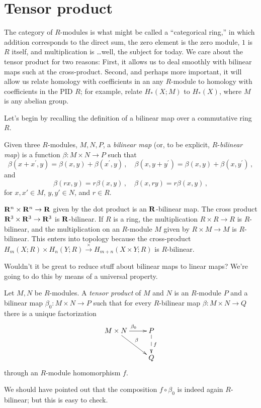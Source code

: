 \section{Tensor product}

The category of $R$-modules is what might be called a ``categorical ring,'' in which addition corresponds to the direct sum, the zero element is the zero module, $1$ is $R$ itself, and multiplication is \ldots well, the subject for today. We care about the tensor product for two reasons: 
First, it allows us to deal smoothly with bilinear maps such at the cross-product. Second, and perhaps more important, it will allow us relate homology
with coefficients in an any $R$-module to homology with coefficients in the 
PID $R$; for example, relate $H_*(X;M)$ to $H_*(X)$, where $M$ is any
abelian group.

Let's begin by recalling the definition of a bilinear map over a commutative ring $R$.
\begin{definition}
Given three $R$-modules, $M,N,P$, a {\em bilinear map} (or, to be explicit, $R$-{\em bilinear map}) is a function $\beta:M\times N\to P$ such that
\[
\beta(x+x^\prime,y)=\beta(x,y)+\beta(x^\prime,y)\,,\quad
\beta(x,y+y^\prime)=\beta(x,y)+\beta(x,y^\prime)\,,
\]
and
\[
\beta(rx,y)=r\beta(x,y)\,,\quad\beta(x,ry)=r\beta(x,y)\,,
\]
for $x,x'\in M$, $y,y'\in N$, and $r\in R$.
\end{definition}

\begin{example}
$\mathbf R^n\times\mathbf R^n\to\mathbf R$ given by the dot product is an $\mathbf R$-bilinear map. The cross product $\mathbf R^3\times\mathbf R^3\to\mathbf R^3$ is $\mathbf R$-bilinear. If $R$ is a ring, the multiplication $R\times R\to R$ is $R$-bilinear, and the multiplication on an $R$-module $M$ given by $R\times M\to M$ is $R$-bilinear. This enters into topology because the cross-product $ H_m(X;R)\times H_n(Y;R)\xrightarrow{\times} H_{m+n}(X\times Y;R)$ is $R$-bilinear.
\end{example}
Wouldn't it be great to reduce stuff about bilinear maps to linear maps? We're going to do this by means of a universal property.
\begin{definition}
Let $M,N$ be $R$-modules. A \emph{tensor product} of $M$ and $N$ is an $R$-module $P$ and a bilinear map $\beta_0:M\times N\rightarrow P$ such that for every $R$-bilinear map $\beta:M\times N\rightarrow Q$ there is a unique factorization
\begin{equation*}
\xymatrix{M\times N\ar[r]^{\beta_0}\ar[dr]^\beta & P\ar@{-->}[d]^f\\
 & Q}
\end{equation*}
through an $R$-module homomorphism $f$. 
\end{definition}
We should have pointed out that the composition $f\circ\beta_0$ is indeed 
again $R$-bilinear; but this is easy to check.

